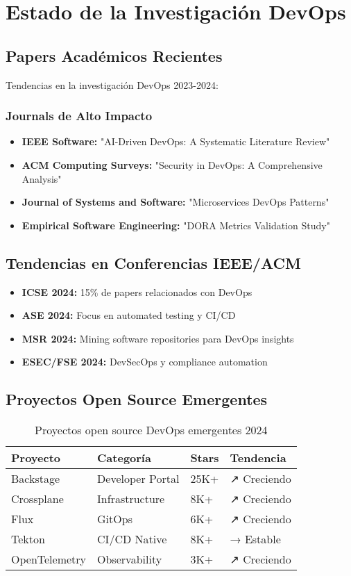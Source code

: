\documentclass[12pt,a4paper]{article}
\begin{document}
\section{Estado de la Investigación DevOps}

\subsection{Papers Académicos Recientes}
Tendencias en la investigación DevOps 2023-2024:

\subsubsection{Journals de Alto Impacto}
\begin{itemize}
    \item \textbf{IEEE Software:} "AI-Driven DevOps: A Systematic Literature Review"
    \item \textbf{ACM Computing Surveys:} "Security in DevOps: A Comprehensive Analysis"
    \item \textbf{Journal of Systems and Software:} "Microservices DevOps Patterns"
    \item \textbf{Empirical Software Engineering:} "DORA Metrics Validation Study"
\end{itemize}

\subsection{Tendencias en Conferencias IEEE/ACM}
\begin{itemize}
    \item \textbf{ICSE 2024:} 15\% de papers relacionados con DevOps
    \item \textbf{ASE 2024:} Focus en automated testing y CI/CD
    \item \textbf{MSR 2024:} Mining software repositories para DevOps insights
    \item \textbf{ESEC/FSE 2024:} DevSecOps y compliance automation
\end{itemize}

\subsection{Proyectos Open Source Emergentes}
\begin{table}[h!]
\centering
\begin{tabular}{|l|l|l|l|}
\hline
\textbf{Proyecto} & \textbf{Categoría} & \textbf{Stars} & \textbf{Tendencia} \\
\hline
Backstage & Developer Portal & 25K+ & ↗️ Creciendo \\
\hline
Crossplane & Infrastructure & 8K+ & ↗️ Creciendo \\
\hline
Flux & GitOps & 6K+ & ↗️ Creciendo \\
\hline
Tekton & CI/CD Native & 8K+ & → Estable \\
\hline
OpenTelemetry & Observability & 3K+ & ↗️ Creciendo \\
\hline
\end{tabular}
\caption{Proyectos open source DevOps emergentes 2024}
\end{table}
\end{document}
